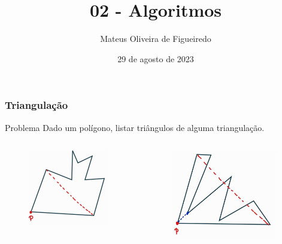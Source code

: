 \documentclass[aspectratio=169,usenames,dvipsnames]{beamer}
\title{02 - Algoritmos}
\author{Mateus Oliveira de Figueiredo}
\date{29 de agosto de 2023}
\begin{document}
\begin{frame}
\titlepage
\end{frame}

\begin{frame}
\frametitle{Triangulação}
  \begin{block}{Problema}
    Dado um polígono, listar triângulos de alguma triangulação.
  \end{block}
  \begin{columns}
    \begin{center}
      \begin{figure}
        \includegraphics[width=0.95\textwidth]{figures/exemplo_0.jpeg}
      \end{figure}
    \end{center}
    \begin{center}
      \begin{figure}
        \includegraphics[width=0.95\textwidth]{figures/exemplo_1.jpeg}

\end{figure}
\end{center}
\end{columns}
\end{frame}
\end{document}

